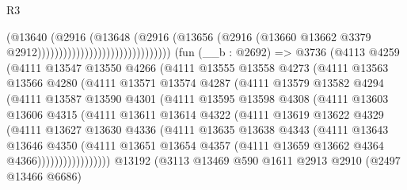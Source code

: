 \begin{lexlean}{R3}
\begin{coremodule}
                                                    (@13640
                                                      (@2916
                                                        (@13648
                                                          (@2916
                                                            (@13656
                                                              (@2916
                                                                (@13660
                                                                  @13662
                                                                  @3379
                                                                  @2912)))))))))))))))))))))))))))))))
    (fun (__b : @2692) =>
    @3736
      (@4113
        @4259
        (@4111
          @13547
          @13550
          @4266
          (@4111
            @13555
            @13558
            @4273
            (@4111
              @13563
              @13566
              @4280
              (@4111
                @13571
                @13574
                @4287
                (@4111
                  @13579
                  @13582
                  @4294
                  (@4111
                    @13587
                    @13590
                    @4301
                    (@4111
                      @13595
                      @13598
                      @4308
                      (@4111
                        @13603
                        @13606
                        @4315
                        (@4111
                          @13611
                          @13614
                          @4322
                          (@4111
                            @13619
                            @13622
                            @4329
                            (@4111
                              @13627
                              @13630
                              @4336
                              (@4111
                                @13635
                                @13638
                                @4343
                                (@4111
                                  @13643
                                  @13646
                                  @4350
                                  (@4111
                                    @13651
                                    @13654
                                    @4357
                                    (@4111 @13659 @13662 @4364 @4366)))))))))))))))))
    @13192
    (@3113
      @13469
      @590
      @1611
      @2913
      @2910
      (@2497 @13466 @6686)

\end{coremodule}
\end{lexlean}
